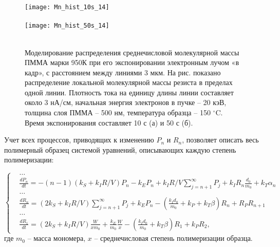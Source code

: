 \documentclass[12pt, letterpaper]{article}
\begin{document}
\begin{figure}[t]
	\begin{center}
		\texttt{[image: Mn\_hist\_10s\_14]} \\
		\vspace{-3.7em}  \vspace{2.7em} \\
		\texttt{[image: Mn\_hist\_50s\_14]} \\
		\vspace{-3.7em}  \vspace{3.7em} \\
	\end{center}
	\vspace{-2.5em}
	\caption{Моделирование распределения среднечисловой молекулярной массы ПММА марки 950К при его экспонировании электронным лучом «в кадр», с расстоянием между линиями 3 мкм. На рис. показано распределение локальной молекулярной массы резиста в пределах одной линии. Плотность тока на единицу длины линии составляет около 3 нА/см, начальная энергия электронов в пучке – 20 кэВ, толщина слоя ПММА -- 500 нм, температура образца -- 150 $^\circ$C. Время экспонирования составляет 10 с (а) и 50 с (б).}
	\label{fig:Mn_hist}
\end{figure}



Учет всех процессов, приводящих к изменению $P_n$ и $R_n$, позволяет описать весь полимерный образец системой уравнений, описывающих каждую степень полимеризации:

\begin{equation}
	\left\{
	\begin{aligned}
		&\dots \\
		&\frac{d P_n}{d t}=-(n-1)(k_S+k_I R / V) P_n-k_E P_n+k_I R / V \sum_{j=n+1}^{\infty} P_j+k_I R_n \frac{d_0}{m_0}+k_T \alpha_n \\
		&\dots \\
		&\frac{d R_n}{d t}=(2 k_S+k_I R / V) \sum_{j=n+1}^{\infty} P_j+k_E P_n-(\frac{k_I d_0}{m_0}+k_P+k_T \beta) R_n+R_P R_{n+1} \\
		&\dots \\
		&\frac{d R_1}{d t}=(2 k_S+k_I R / V) \frac{W}{x m_0}+\frac{k_E}{m_0} \frac{W}{x}-(\frac{k_I d_0}{m_0}+k_T \beta) R_1+k_P R_2,
	\end{aligned}
	\right.
\end{equation}
где $m_0$ -- масса мономера, $x$ -- среднечисловая степень полимеризации образца. 
\end{document}
